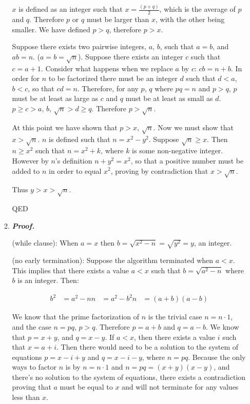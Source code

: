 \documentclass[11pt]{article}
\theoremstyle{definition}
\begin{document}
\begin{enumerate}
\begin{enumerate}
$x$ is defined as an integer such that $x = \frac{(p+q)}{2}$, which is the average of $p$ and $q$. Therefore $p$ or $q$ must be larger than $x$, with the other being smaller. We have defined $p > q$, therefore $p > x$.

Suppose there exists two pairwise integers, $a$, $b$, such that $a = b$, and $ab = n$. ($a = b = \sqrt{n}$). 
Suppose there exists an integer $c$ such that $c = a + 1$. Consider what happens when we replace $a$ by $c$: $cb = n + b$. In order for $n$ to be factorized there must be an integer $d$ such that $d < a$, $b < c$, so that $cd = n$. Therefore, for any $p$, $q$ where $pq = n$ and $p > q$, $p$ must be at least as large as $c$ and $q$ must be at least as small as $d$. $p \geq c > a$, $b$, $\sqrt{n} > d \geq q$. Therefore $p > \sqrt{n}$. 

At this point we have shown that $p > x$, $\sqrt{n}$. Now we must show that $x > \sqrt{n}$. $n$ is defined such that $n = x^2 - y^2$. Suppose $\sqrt{n} \geq x$. Then $n \geq x^2$ such that $n = x^2 + k$, where $k$ is some non-negative integer. However by $n$’s definition $n + y^2 = x^2$, so that a positive number must be added to $n$ in order to equal $x^2$, proving by contradiction that $x > \sqrt{n}$. 

Thus $y > x > \sqrt{n}$. 

QED

\item  %

\textbf{\emph{Proof.}}

(while clause): When $a = x$ then $b = \sqrt{x^2 - n} = \sqrt{y^2} = y$, an integer. 

(no early termination): Suppose the algorithm terminated when $a < x$. This implies that there exists a value $a < x$ such that $b = \sqrt{a^2 - n}$ where $b$ is an integer. Then: 

\begin{align*}
b^2 &= a^2 - n
n &= a^2 - b^2
n &= (a + b)(a - b)
\end{align*} 

We know that the prime factorization of $n$ is the trivial case $n = n \cdot 1$, and the case $n = pq$, $p > q$. Therefore $p = a + b$ and $q = a - b$. We know that $p = x + y$, and $q = x - y$. If $a < x$, then there exists a value $i$ such that $x = a + i$. Then there would need to be a solution to the system of equations $p = x - i + y$ and $q = x - i - y$, where $n = pq$. Because the only ways to factor $n$ is by $n = n \cdot 1$ and $n = pq = (x + y)(x - y)$, and there’s no solution to the system of equations, there exists a contradiction proving that $a$ must be equal to $x$ and will not terminate for any values less than $x$. 


\end{enumerate}
\end{enumerate}
\end{document}
